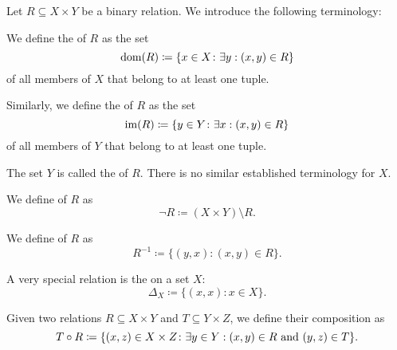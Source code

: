 \begin{definition}\label{def:binary_relation}
  Let \( R \subseteq X \times Y \) be a binary relation. We introduce the following terminology:
  \begin{DefEnum}[series=def:binary_relation]
     We define the  of \( R \) as the set
    \begin{equation*}
      \operatorname{dom}(R) \coloneqq \{ x \in X \colon \exists y: (x, y) \in R \}
    \end{equation*}
    of all members of \( X \) that belong to at least one tuple.

     Similarly, we define the  of \( R \) as the set
    \begin{equation*}
      \operatorname{im}(R) \coloneqq \{ y \in Y \colon \exists x: (x, y) \in R \}
    \end{equation*}
    of all members of \( Y \) that belong to at least one tuple.

     The set \( Y \) is called the  of \( R \). There is no similar established terminology for \( X \).

     We define  of \( R \) as
    \begin{equation*}
      \neg R \coloneqq (X \times Y) \setminus R.
    \end{equation*}

     We define  of \( R \) as
    \begin{equation*}
      R^{-1} \coloneqq \{ (y, x) \colon (x, y) \in R \}.
    \end{equation*}

     A very special relation is the  on a set \( X \):
    \begin{equation*}
      \Delta_X \coloneqq \{ (x, x) \colon x \in X \}.
    \end{equation*}

     Given two relations \( R \subseteq X \times Y \) and \( T \subseteq Y \times Z \), we define their composition as
    \begin{equation*}
      T \circ R \coloneqq \{ (x, z) \in X \times Z \colon \exists y \in Y: (x, y) \in R \text{ and } (y, z) \in T \}.
    \end{equation*}
  \end{DefEnum}


\end{definition}
